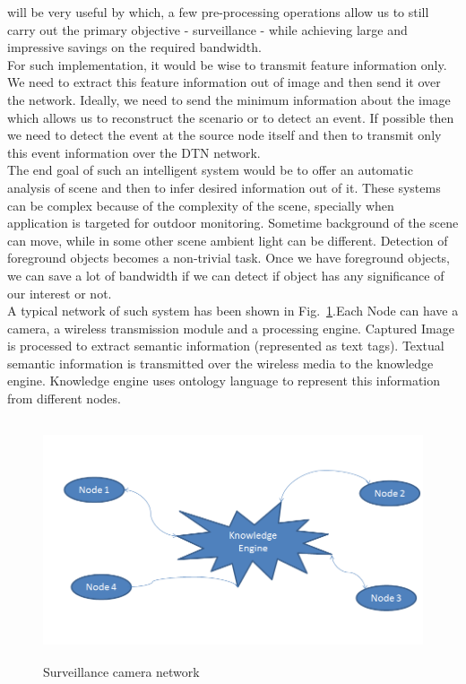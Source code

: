 will be very useful by which, a few pre-processing operations allow us to
still carry out the primary objective - surveillance - while achieving
large and impressive savings on the required bandwidth.\\
\indent  For such implementation, it would be wise to transmit feature
information only. We need to extract this feature information out of
image and then send it over the network.  Ideally, we need to send the
minimum information about the image which allows us to reconstruct the
scenario or to detect an event. If possible then we need to detect the
event at the source node itself and then to transmit only this event
information over the DTN network.\\
\indent The end goal of such an intelligent system would be to offer an
automatic analysis of scene and then to infer desired information out of
it. These systems can be complex because of the complexity of the scene,
specially when application is targeted for outdoor monitoring.  Sometime
background of the scene can move, while in some other scene ambient
light can be different. Detection of foreground objects becomes a
non-trivial task.  Once we have foreground objects, we can save a lot of
bandwidth if we can detect if object has any significance of our
interest or not.\\
\indent A typical network of such system has been shown in
Fig.~\ref{KE}.Each Node can have a camera, a wireless transmission
module and a processing engine. Captured Image is processed to extract
semantic information (represented as text tags). Textual semantic
information is transmitted over the wireless media to the knowledge
engine. Knowledge engine uses ontology language to represent this
information from different nodes.
\begin{figure}[!b]
\centering
\includegraphics[height=200pt]{Figures/KE}
\caption{Surveillance camera network}
\label{KE}
\end{figure}

